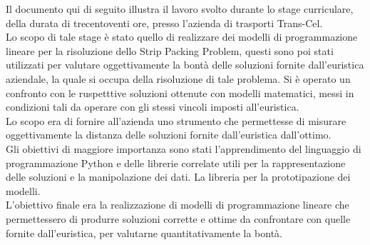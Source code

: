 
Il documento qui di seguito illustra il lavoro svolto durante lo stage curriculare, della durata di trecentoventi ore, presso l’azienda di trasporti Trans-Cel.\\
Lo scopo di tale stage è stato quello di realizzare dei modelli di programmazione lineare per la risoluzione dello Strip Packing Problem, questi sono poi stati utilizzati per valutare oggettivamente la bontà delle soluzioni fornite dall'euristica aziendale, la quale si occupa della risoluzione di tale problema.
Si è operato un confronto con le ruspetttive soluzioni ottenute con modelli matematici, messi in condizioni tali da operare con gli stessi vincoli imposti all'euristica.\\
Lo scopo era di fornire all'azienda uno strumento che permettesse di misurare oggettivamente la distanza delle soluzioni fornite dall'euristica dall'ottimo.\\
\newline
Gli obiettivi di maggiore importanza sono stati l'apprendimento del linguaggio di programmazione Python e delle librerie correlate utili per la rappresentazione delle soluzioni e la manipolazione dei dati. La libreria  per la prototipazione dei modelli.\\
L'obiettivo finale era la realizzazione di modelli di programmazione lineare che permettessero di produrre soluzioni corrette e ottime da confrontare con quelle fornite dall'euristica, per valutarne quantitativamente la bontà.
